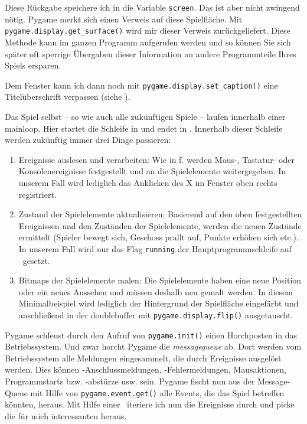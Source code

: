 Diese Rückgabe speichere ich in die Variable \texttt{screen}. Das ist aber nicht zwingend nötig. Pygame merkt sich einen Verweis auf diese Spielfläche. Mit \texttt{pygame\-.dis\-play\-.get\-\_sur\-face()} wird mir dieser Verweis zurückgeliefert. Diese Methode kann im ganzen Programm aufgerufen werden und so können Sie sich später oft sperrige Übergaben dieser Information an andere Programmteile Ihres Spiels ersparen.

Dem Fenster kann ich dann noch mit \texttt{pygame.display.set\_caption()} eine Titelüberschrift verpassen (siehe ).

Das Spiel selbst -- so wie auch alle zukünftigen Spiele -- laufen innerhalb einer \Gls{mainloop}. Hier startet die Schleife in  und endet in . Innerhalb dieser Schleife werden zukünftig immer drei Dinge passieren: 
\begin{enumerate}
	\item Ereignisse auslesen und verarbeiten: Wie in f. werden Maus-, Tastatur- oder Konsolenereignisse festgestellt und an die Spielelemente weitergegeben. In unserem Fall wird lediglich das Anklicken des X im Fenster oben rechts registriert.  
	\item Zustand der Spielelemente aktualisieren: Basierend auf den oben festgestellten Ereignissen und den Zuständen der Spielelemente, werden die neuen Zustände ermittelt (Spieler bewegt sich, Geschoss prallt auf, Punkte erhöhen sich etc.). In unserem Fall wird nur das Flag \texttt{running} der Hauptprogrammschleife auf \false\ gesetzt.
	\item Bitmaps der Spielelemente malen: Die Spielelemente haben eine neue Position oder ein neues Aussehen und müssen deshalb neu gemalt werden. In diesem Minimalbeispiel wird lediglich  der Hintergrund der Spielfläche eingefärbt und anschließend in  der \Gls{doublebuffer} mit \texttt{pygame.display.flip()} ausgetauscht.
\end{enumerate}

Pygame schleust durch den Aufruf von \texttt{py\-game.\-init()} einen Horchposten in das Betriebssystem. Und zwar horcht Pygame die \emph{\Gls{messagequeue}} ab. Dort werden vom Betriebssystem alle Meldungen eingesammelt, die durch Ereignisse ausgelöst werden. Dies können -An\-schluss\-mel\-dungen, -Fehlermeldungen, Mausaktionen, Programmstarts bzw. -abstürze  usw. sein. Pygame fischt nun aus der Message-Queue mit Hilfe von \texttt{pygame.event.get()} alle Events, die das Spiel betreffen könnten, heraus. Mit Hilfe einer \forSchleife\ iteriere ich nun die Ereignisse durch und picke die für mich interessanten heraus. 

